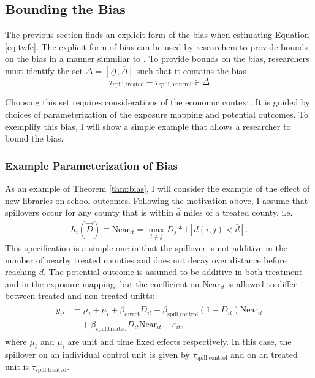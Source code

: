 \documentclass[11pt]{article}
\begin{document}
\subsection{Bounding the Bias}

The previous section finds an explicit form of the bias when estimating Equation \ref{eq:twfe}. The explicit form of bias can be used by researchers to provide bounds on the bias in a manner simmilar to \citet{Rambachan_Roth_2020}. To provide bounds on the bias, researchers must identify the set $\Delta = [\underline{\Delta}, \overline{\Delta}]$ such that it contains the bias \[ 
    \tau_{\text{spill,treated}} - \tau_{\text{spill, control}} \in \Delta
\]

Choosing this set requires considerations of the economic context. It is guided by choices of parameterization of the exposure mapping and potential outcomes. To exemplify this bias, I will show a simple example that allows a researcher to bound the bias. 


\subsubsection{Example Parameterization of Bias}

As an example of Theorem \ref{thm:bias}, I will consider the example of the effect of new libraries on school outcomes. Following the motivation above, I assume that spillovers occur for any county that is within $\bar{d}$ miles of a treated county, i.e. 
\begin{align}
    \label{eq:example_exposure}
    h_i(\vec{D}) \equiv \text{Near}_{it} = \max_{i \neq j} D_j * 1[ d(i,j) < \bar{d} ].
\end{align}
This specification is a simple one in that the spillover is not additive in the number of nearby treated counties and does not decay over distance before reaching $\bar{d}$. The potential outcome is assumed to be additive in both treatment and in the exposure mapping, but the coefficient on $\text{Near}_{it}$ is allowed to differ between treated and non-treated unitts:
\begin{align}
    \label{eq:example_po}
    \begin{split}
        y_{it} &= \mu_t + \mu_i + \beta_{\text{direct}} D_{it} + \beta_{\text{spill,control}} (1-D_{it}) \text{Near}_{it} \\
        &\quad + \beta_{\text{spill,treated}} D_{it} \text{Near}_{it} + \varepsilon_{it},
    \end{split}
\end{align}
where $\mu_t$ and $\mu_i$ are unit and time fixed effects respectively. In this case, the spillover on an individual control unit is given by $\tau_{\text{spill,control}}$ and on an treated unit is $\tau_{\text{spill,treated}}$. 
\end{document}
